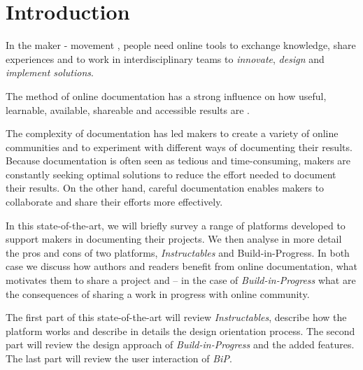 \newcommand{\package}{\emph}

\chapter{Introduction}

In the maker - movement \cite{davies2017hackerspaces}, people need online tools to exchange knowledge, share experiences and to work in interdisciplinary teams to \textit{innovate}, \textit{design} and \textit{implement solutions}.

The method of online documentation has a strong influence on how useful, learnable, available, shareable and accessible results are \cite{harcourt2016re}.

The complexity of documentation has led makers to create a variety of online communities and to experiment with different ways of documenting their results. Because documentation is often seen as tedious and time-consuming, makers are constantly seeking optimal solutions to reduce the effort needed to document their results. On the other hand, careful documentation enables makers to collaborate and share their efforts more effectively.


In this state-of-the-art, we will briefly survey a range of platforms developed to support makers in documenting their projects. We then analyse in more detail the pros and cons of two platforms, \textit{Instructables} and Build-in-Progress. In both case we discuss how authors and readers benefit from online documentation, what motivates them to share a project and – in the case of \textit{Build-in-Progress} what are the consequences of sharing a work in progress with online community.

The first part of this state-of-the-art will review \textit{Instructables}, describe how the platform works and describe in details the design orientation process. The second part will review the design approach of \textit{Build-in-Progress} and the added features. The last part will review the user interaction of \textit{BiP}. 

